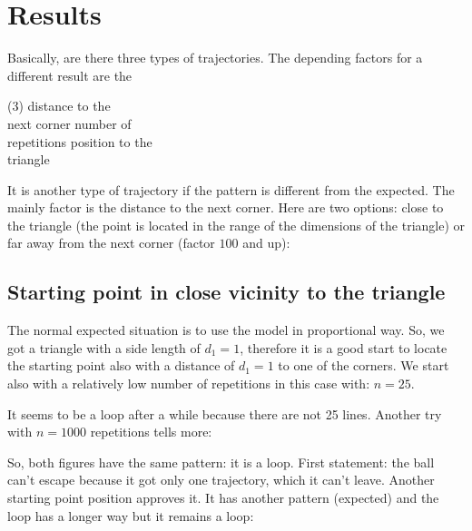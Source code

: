 \documentclass[11pt,a4paper]{article}
\begin{document}
\section{Results}
Basically, are there three types of trajectories. The depending factors for a different result are the
\begin{tasks}(3)
\task distance to the \\next corner
\task number of \\repetitions
\task position to the \\triangle
\end{tasks}
It is another type of trajectory if the pattern is different from the expected. The mainly factor is the distance to the next corner. Here are two options: close to the triangle (the point is located in the range of the dimensions of the triangle) or far away from the next corner (factor \(100\) and up):
 \subsection{Starting point in close vicinity to the triangle}
The normal expected situation is to use the model in proportional way. So, we got a triangle with a side length of \(d_1=1\), therefore it is a good start to locate the starting point also with a distance of \(d_1=1\) to one of the corners. We start also with a relatively low number of repetitions in this case with: \(n=25\).

It seems to be a loop after a while because there are not 25 lines. Another try with \(n=1000\) repetitions tells more:

So, both figures have the same pattern: it is a loop. First statement: the ball can’t escape because it got only one trajectory, which it can’t leave. Another starting point position approves it. It has another pattern (expected) and the loop has a longer way but it remains a loop:
\end{document}
